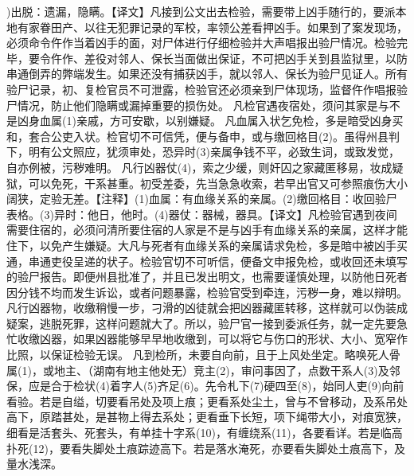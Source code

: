 \documentclass[12pt,UTF8]{ctexbook}
\begin{document}
)出脱：遗漏，隐瞒。【译文】凡接到公文出去检验，需要带上凶手随行的，要派本地有家眷田产、以往无犯罪记录的军校，率领公差看押凶手。如果到了案发现场，必须命令仵作当着凶手的面，对尸体进行仔细检验并大声唱报出验尸情况。检验完毕，要令仵作、差役对邻人、保长当面做出保证，不可把凶手关到县监狱里，以防串通倒弄的弊端发生。如果还没有捕获凶手，就以邻人、保长为验尸见证人。所有验尸记录，初、复检官员不可泄露，检验官还必须亲到尸体现场，监督仵作唱报验尸情况，防止他们隐瞒或漏掉重要的损伤处。
凡检官遇夜宿处，须问其家是与不是凶身血属(1)亲戚，方可安歇，以别嫌疑。
凡血属入状乞免检，多是暗受凶身买和，套合公吏入状。检官切不可信凭，便与备申，或与缴回格目(2)。虽得州县判下，明有公文照应，犹须审处，恐异时(3)亲属争钱不平，必致生词，或致发觉，自亦例被，污秽难明。
凡行凶器仗(4)，索之少缓，则奸囚之家藏匿移易，妆成疑狱，可以免死，干系甚重。初受差委，先当急急收索，若早出官又可参照痕伤大小阔狭，定验无差。【注释】(1)血属：有血缘关系的亲属。(2)缴回格目：收回验尸表格。(3)异时：他日，他时。(4)器仗：器械，器具。【译文】凡检验官遇到夜间需要住宿的，必须问清所要住宿的人家是不是与凶手有血缘关系的亲属，这样才能住下，以免产生嫌疑。大凡与死者有血缘关系的亲属请求免检，多是暗中被凶手买通，串通吏役呈递的状子。检验官切不可听信，便备文申报免检，或收回还未填写的验尸报告。即便州县批准了，并且已发出明文，也需要谨慎处理，以防他日死者因分钱不均而发生诉讼，或者问题暴露，检验官受到牵连，污秽一身，难以辩明。凡行凶器物，收缴稍慢一步，刁滑的凶徒就会把凶器藏匿转移，这样就可以伪装成疑案，逃脱死罪，这样问题就大了。所以，验尸官一接到委派任务，就一定先要急忙收缴凶器，如果凶器能够早早地收缴到，可以将它与伤口的形状、大小、宽窄作比照，以保证检验无误。
凡到检所，未要自向前，且于上风处坐定。略唤死人骨属(1)，或地主、（湖南有地主他处无）竞主(2)，审问事因了，点数干系人(3)及邻保，应是合于检状(4)着字人(5)齐足(6)。先令札下(7)硬四至(8)，始同人吏(9)向前看验。若是自缢，切要看吊处及项上痕；更看系处尘土，曾与不曾移动，及系吊处高下，原踏甚处，是甚物上得去系处；更看垂下长短，项下绳带大小，对痕宽狭，细看是活套头、死套头，有单挂十字系(10)，有缠绕系(11)，各要看详。若是临高扑死(12)，要看失脚处土痕踪迹高下。若是落水淹死，亦要看失脚处土痕高下，及量水浅深。
\end{document}
